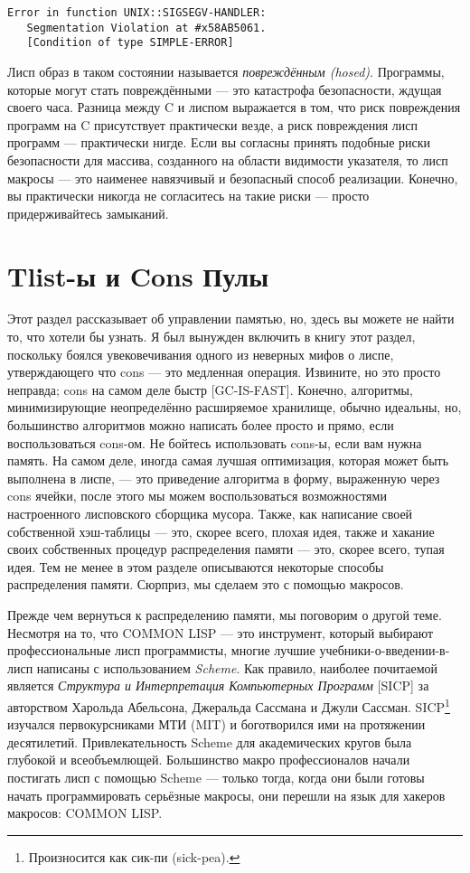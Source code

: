 \begin{verbatim}
Error in function UNIX::SIGSEGV-HANDLER:
   Segmentation Violation at #x58AB5061.
   [Condition of type SIMPLE-ERROR]
\end{verbatim}

Лисп образ в таком состоянии называется \emph{повреждённым (hosed)}. Программы, которые могут стать повреждёнными --- это катастрофа безопасности, ждущая своего часа. Разница между C и лиспом выражается в том, что риск повреждения программ на C присутствует практически везде, а риск повреждения лисп программ --- практически нигде. Если вы согласны принять подобные риски безопасности для массива, созданного на области видимости указателя, то лисп макросы --- это наименее навязчивый и безопасный способ реализации. Конечно, вы практически никогда не согласитесь на такие риски --- просто придерживайтесь замыканий.

\section{Tlist-ы и Cons Пулы}\label{section_tlists_and_cons_pools}

Этот раздел рассказывает об управлении памятью, но, здесь вы можете не найти то, что хотели бы узнать. Я был вынужден включить в книгу этот раздел, поскольку боялся увековечивания одного из неверных мифов о лиспе, утверждающего что cons --- это медленная операция. Извините, но это просто неправда; cons на самом деле быстр [GC-IS-FAST]. Конечно, алгоритмы, минимизирующие неопределённо расширяемое хранилище, обычно идеальны, но, большинство алгоритмов можно написать более просто и прямо, если воспользоваться cons-ом. Не бойтесь использовать cons-ы, если вам нужна память. На самом деле, иногда самая лучшая оптимизация, которая может быть выполнена в лиспе, --- это приведение алгоритма в форму, выраженную через cons ячейки, после этого мы можем воспользоваться возможностями настроенного лисповского сборщика мусора. Также, как написание своей собственной хэш-таблицы --- это, скорее всего, плохая идея, также и хакание своих собственных процедур распределения памяти --- это, скорее всего, тупая идея. Тем не менее в этом разделе описываются некоторые способы распределения памяти. Сюрприз, мы сделаем это с помощью макросов.

Прежде чем вернуться к распределению памяти, мы поговорим о другой теме. Несмотря на то, что COMMON LISP --- это инструмент, который выбирают профессиональные лисп программисты, многие лучшие учебники-о-введении-в-лисп написаны с использованием \emph{Scheme}. Как правило, наиболее почитаемой является \emph{Структура и Интерпретация Компьютерных Программ} [SICP] за авторством Харольда Абельсона, Джеральда Сассмана и Джули Сассман. SICP\footnote{Произносится как сик-пи (sick-pea).} изучался первокурсниками МТИ (MIT) и боготворился ими на протяжении десятилетий. Привлекательность Scheme для академических кругов была глубокой и всеобъемлющей. Большинство макро профессионалов начали постигать лисп с помощью Scheme --- только тогда, когда они были готовы начать программировать серьёзные макросы, они перешли на язык для хакеров макросов: COMMON LISP.

